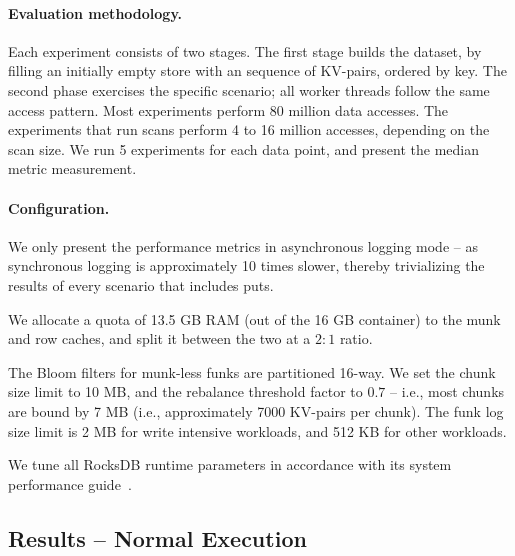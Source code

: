 \paragraph{Evaluation methodology.} Each experiment consists of two stages. The first stage builds 
the dataset, by filling an initially empty store with an sequence of KV-pairs, ordered by key. The second 
phase exercises the specific scenario; all worker threads follow the same access pattern. Most experiments 
perform 80 million data accesses. The experiments that run scans perform 4 to 16 million accesses, depending 
on the scan size. We run 5 experiments for each data point, and present the median metric measurement. 

\paragraph{Configuration.} 
We only present the performance metrics in asynchronous logging mode -- as synchronous logging 
is approximately 10 times slower, thereby trivializing the results of every scenario that includes puts. 

We allocate a quota of 13.5 GB RAM (out of the 16 GB container) to the munk and row caches, 
and split it between the two at a $2:1$ ratio. 

The Bloom filters for munk-less funks are partitioned 16-way.  
We set the \sys\/ chunk size limit to 10 MB, and the rebalance threshold factor to $0.7$ -- i.e., 
most chunks are bound by 7 MB (i.e., approximately 7000 KV-pairs per chunk). The funk log
size limit is 2 MB for write intensive workloads, and 512 KB for other workloads.

We tune all RocksDB runtime parameters in accordance with its system performance guide~\cite{RocksDBPerf}.   

\subsection{Results -- Normal Execution}

